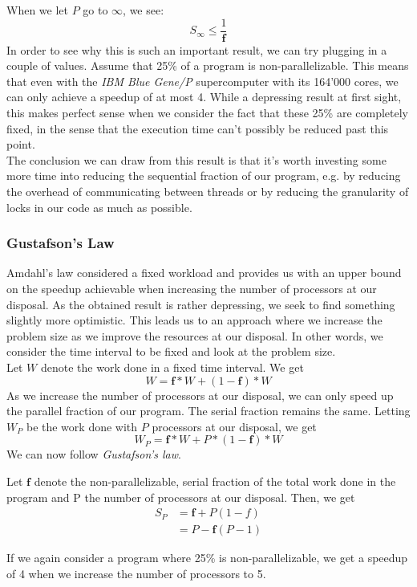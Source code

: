 \documentclass[main.tex]{subfiles}
\begin{document}
When we let $P$ go to $\infty$, we see:
\begin{equation*}
    S_\infty \leq \frac{1}{\mathbf{f}}
\end{equation*}
In order to see why this is such an important result, we can try plugging in a couple of values. Assume that 25\% of a program is non-parallelizable. This means that even with the \textit{IBM Blue Gene/P} supercomputer with its 164'000 cores, we can only achieve a speedup of at most 4. While a depressing result at first sight, this makes perfect sense when we consider the fact that these 25\% are completely fixed, in the sense that the execution time can't possibly be reduced past this point.\\[0.3cm]
The conclusion we can draw from this result is that it's worth investing some more time into reducing the sequential fraction of our program, e.g. by reducing the overhead of communicating between threads or by reducing the granularity of locks in our code as much as possible.


\subsubsection{Gustafson's Law}
Amdahl's law considered a fixed workload and provides us with an upper bound on the speedup achievable when increasing the number of processors at our disposal. As the obtained result is rather depressing, we seek to find something slightly more optimistic. This leads us to an approach where we increase the problem size as we improve the resources at our disposal. In other words, we consider the time interval to be fixed and look at the problem size.\\
Let $W$ denote the work done in a fixed time interval. We get
\begin{equation*}
    W = \mathbf{f} * W + (1 - \mathbf{f}) * W
\end{equation*}
As we increase the number of processors at our disposal, we can only speed up the parallel fraction of our program. The serial fraction remains the same. Letting $W_P$ be the work done with $P$ processors at our disposal, we get
\begin{equation*}
    W_P = \mathbf{f} * W + P * (1 - \mathbf{f}) * W
\end{equation*}
We can now follow \textit{Gustafson's law}.
\begin{theorem}
    Let $\mathbf{f}$ denote the non-parallelizable, serial fraction of the total work done in the program and P the number of processors at our disposal. Then, we get
    \begin{align*}
        S_P &= \mathbf{f} + P(1-f)\\
            &= P - \mathbf{f}(P-1)
    \end{align*}
\end{theorem}
If we again consider a program where 25\% is non-parallelizable, we get a speedup of 4 when we increase the number of processors to 5.
\end{document}

